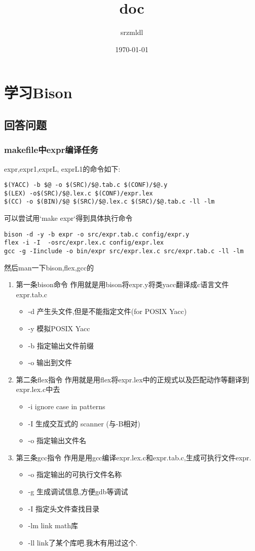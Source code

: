 \documentclass[11pt]{article}
\author{srzmldl}
\date{\today}
\title{doc}
\begin{document}
\maketitle
\tableofcontents

\section{学习Bison}
\label{sec-1}
\subsection{回答问题}
\label{sec-1-1}
\subsubsection{makefile中expr编译任务}
\label{sec-1-1-1}
expr,expr1,exprL, exprL1的命令如下:
\begin{verbatim}
$(YACC) -b $@ -o $(SRC)/$@.tab.c $(CONF)/$@.y
$(LEX) -o$(SRC)/$@.lex.c $(CONF)/expr.lex
$(CC) -o $(BIN)/$@ $(SRC)/$@.lex.c $(SRC)/$@.tab.c -ll -lm
\end{verbatim}
可以尝试用`make expr`得到具体执行命令
\begin{verbatim}
bison -d -y -b expr -o src/expr.tab.c config/expr.y
flex -i -I  -osrc/expr.lex.c config/expr.lex
gcc -g -Iinclude -o bin/expr src/expr.lex.c src/expr.tab.c -ll -lm
\end{verbatim}
然后man一下bison,flex,gcc的
\begin{enumerate}
\item 第一条bison命令
\label{sec-1-1-1-1}
作用就是用bison将expr.y将类yacc翻译成c语言文件expr.tab.c
\begin{itemize}
\item -d 产生头文件,但是不能指定文件(for POSIX Yacc)
\item -y 模拟POSIX Yacc
\item -b 指定输出文件前缀
\item -o 输出到文件
\end{itemize}
\item 第二条flex指令
\label{sec-1-1-1-2}
作用就是用flex将expr.lex中的正规式以及匹配动作等翻译到expr.lex.c中去
\begin{itemize}
\item -i ignore case in patterns
\item -I 生成交互式的 scanner (与-B相对)
\item -o 指定输出文件名
\end{itemize}
\item 第三条gcc指令
\label{sec-1-1-1-3}
作用是用gcc编译expr.lex.c和expr.tab.c,生成可执行文件expr.
\begin{itemize}
\item -o 指定输出的可执行文件名称
\item -g 生成调试信息,方便gdb等调试
\item -I 指定头文件查找目录
\item -lm link math库
\item -ll link了某个库吧.我木有用过这个.
\end{itemize}
\end{enumerate}
\end{document}
